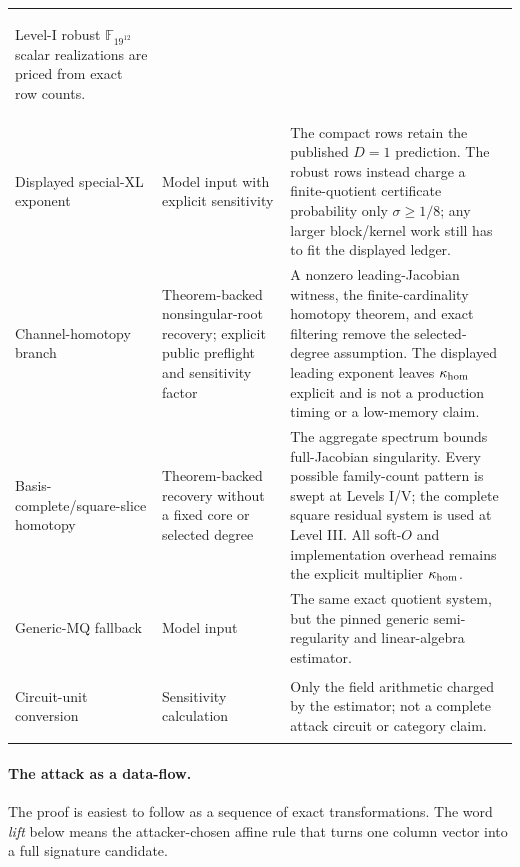 \documentclass[11pt]{article}
\newcommand{\F}{\mathbb F}
\begin{document}
\begin{table}[tbp]
\begin{tabularx}{0.97\textwidth}{@{}>{\bfseries\raggedright\arraybackslash}p{}>{\raggedright\arraybackslash}p{}X@{}}
Level-I robust $\F_{19^{12}}$ scalar realizations are priced from exact row
counts.\\
Displayed special-XL exponent & Model input with explicit sensitivity & The
compact rows retain the published $D=1$ prediction.  The robust rows instead
charge a finite-quotient certificate probability only $\sigma\ge1/8$; any
larger block/kernel work still has to fit the displayed ledger.\\
Channel-homotopy branch & Theorem-backed nonsingular-root recovery; explicit
public preflight and sensitivity factor & A nonzero leading-Jacobian witness,
the finite-cardinality homotopy theorem, and exact filtering remove the
selected-degree assumption.  The displayed leading exponent leaves
$\kappa_{\rm hom}$ explicit and is not a production timing or a low-memory
claim.\\
Basis-complete/square-slice homotopy & Theorem-backed recovery without a fixed
core or selected degree & The aggregate spectrum bounds full-Jacobian
singularity.  Every possible family-count pattern is swept at Levels I/V; the
complete square residual system is used at Level III.  All soft-$O$ and
implementation overhead remains the explicit multiplier $\kappa_{\rm hom}$.\\
Generic-MQ fallback & Model input & The same exact quotient system, but the
pinned generic semi-regularity and linear-algebra estimator.\\
Circuit-unit conversion & Sensitivity calculation & Only the field arithmetic
charged by the estimator; not a complete attack circuit or category claim.\\
\bottomrule
\end{tabularx}
\end{table}

\paragraph{The attack as a data-flow.}
The proof is easiest to follow as a sequence of exact transformations.  The
word \emph{lift} below means the attacker-chosen affine rule that turns one
column vector into a full signature candidate.
\end{document}
